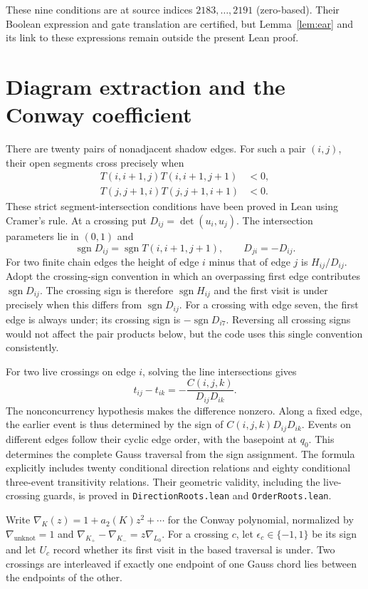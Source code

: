 \documentclass[11pt]{article}
\newcommand{\sgn}{\operatorname{sgn}}
\newcommand{\code}[1]{\nolinkurl{#1}}
\begin{document}
These nine conditions are at source indices $2183,\ldots,2191$
(zero-based). Their Boolean expression and gate translation are
certified, but Lemma~\ref{lem:ear} and its link to these expressions
remain outside the present Lean proof.

\section{Diagram extraction and the Conway coefficient}\label{sec:diagram}
There are twenty pairs of nonadjacent shadow edges. For such a pair
$(i,j)$, their open segments cross precisely when
\begin{align*}
 T(i,i+1,j)T(i,i+1,j+1)&<0,\\
 T(j,j+1,i)T(j,j+1,i+1)&<0.
\end{align*}
These strict segment-intersection conditions have been proved in Lean
using Cramer's rule. At a crossing put $D_{ij}=\det(u_i,u_j)$.
The intersection parameters lie in $(0,1)$ and
\[
 \sgn D_{ij}=\sgn T(i,i+1,j+1),\qquad D_{ji}=-D_{ij}.
\]
For two finite chain edges the height of edge $i$ minus that of edge
$j$ is $H_{ij}/D_{ij}$. Adopt the crossing-sign convention in which
an overpassing first edge contributes $\sgn D_{ij}$.
The crossing sign is therefore $\sgn H_{ij}$ and the first visit is
under precisely when this differs from $\sgn D_{ij}$.
For a crossing with edge seven, the first edge is always under;
its crossing sign is $-\sgn D_{i7}$. Reversing all crossing signs
would not affect the pair products below, but the code uses this
single convention consistently.

For two live crossings on edge $i$, solving the line intersections gives
\begin{equation}\label{eq:order}
 t_{ij}-t_{ik}=-\frac{C(i,j,k)}{D_{ij}D_{ik}}.
\end{equation}
The nonconcurrency hypothesis makes the difference nonzero. Along a
fixed edge, the earlier event is thus determined by the sign of
$C(i,j,k)D_{ij}D_{ik}$. Events on different edges follow their cyclic
edge order, with the basepoint at $q_0$. This determines the complete
Gauss traversal from the sign assignment. The formula explicitly
includes twenty conditional direction relations and eighty conditional
three-event transitivity relations. Their geometric validity, including
the live-crossing guards, is proved in \code{DirectionRoots.lean} and
\code{OrderRoots.lean}.

Write $\nabla_K(z)=1+a_2(K)z^2+\cdots$ for the Conway polynomial,
normalized by $\nabla_{\mathrm{unknot}}=1$ and
$\nabla_{K_+}-\nabla_{K_-}=z\nabla_{L_0}$.
For a crossing $c$, let $\epsilon_c\in\{-1,1\}$ be its sign and let
$U_c$ record whether its first visit in the based traversal is under.
Two crossings are interleaved if exactly one endpoint of one Gauss
chord lies between the endpoints of the other.
\end{document}
